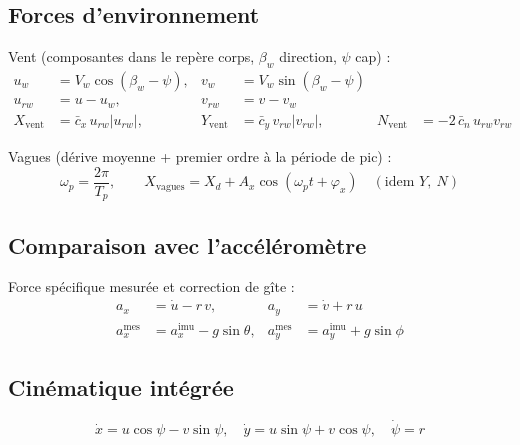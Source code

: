 \documentclass{rapportEILCO}
\begin{document}
\begin{appendix}
		\subsection{Forces d'environnement}
		\label{app:env_forces}
		
		Vent (composantes dans le repère corps, $\beta_{w}$ direction, $\psi$ cap) :
		\begin{align}
			u_{w} &= V_{w}\cos(\beta_{w}-\psi), &
			v_{w} &= V_{w}\sin(\beta_{w}-\psi) \label{eq:uw}\\
			u_{rw} &= u-u_{w}, &
			v_{rw} &= v-v_{w} \label{eq:urw}\\
			X_{\mathrm{vent}} &= \bar{c}_{x}\,u_{rw}|u_{rw}|, &
			Y_{\mathrm{vent}} &= \bar{c}_{y}\,v_{rw}|v_{rw}|, &
			N_{\mathrm{vent}} &= -2\,\bar{c}_{n}\,u_{rw}v_{rw} \label{eq:fvent}
		\end{align}
		
		Vagues (dérive moyenne + premier ordre à la période de pic) :
		\begin{equation}
			\omega_{p}=\frac{2\pi}{T_{p}},\qquad
			X_{\mathrm{vagues}} = X_{d} + A_{x}\cos(\omega_{p}t+\varphi_{x})
			\quad(\text{idem } Y,\ N)
			\label{eq:fvagues}
		\end{equation}
		
		\subsection{Comparaison avec l'accéléromètre}
		\label{app:imu}
		
		Force spécifique mesurée et correction de gîte :
		\begin{align}
			a_{x} &= \dot{u} - r\,v, &
			a_{y} &= \dot{v} + r\,u \label{eq:spec}\\
			a_{x}^{\mathrm{mes}} &= a_{x}^{\mathrm{imu}} - g\sin\theta, &
			a_{y}^{\mathrm{mes}} &= a_{y}^{\mathrm{imu}} + g\sin\phi \label{eq:tilt}
		\end{align}
		
		\subsection{Cinématique intégrée}
		\label{app:cinematique}
		
		\begin{equation}
			\dot{x} = u\cos\psi - v\sin\psi,\quad
			\dot{y} = u\sin\psi + v\cos\psi,\quad
			\dot{\psi} = r
			\label{eq:kin}
		\end{equation}
		
		
	\end{appendix}
	
\end{document}
